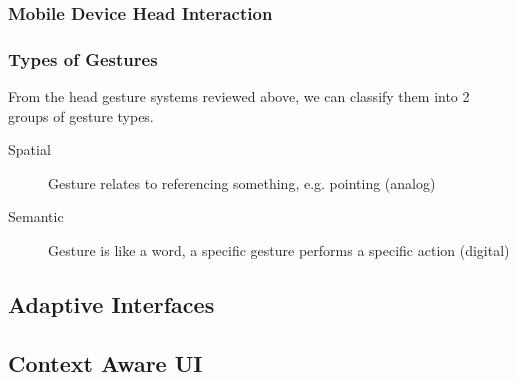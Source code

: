
\subsubsection{Mobile Device Head Interaction}


\subsubsection{Types of Gestures} %
From the head gesture systems reviewed above, we can classify them into 2 groups of gesture types.
\begin{description}
    \item[Spatial]  Gesture relates to referencing something, e.g. pointing (analog)
    \item[Semantic] Gesture is like a word, a specific gesture performs a specific action (digital)
\end{description}


\subsection{Adaptive Interfaces}
\subsection{Context Aware UI}

